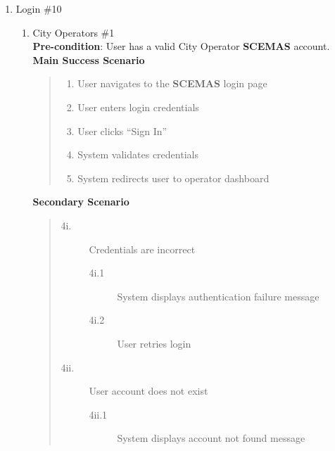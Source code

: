 \documentclass[]{article}
\begin{document}
\begin{enumerate}[{\bf BE10.}]
    \item Login \#10
        \begin{enumerate}[{\bf VP1.}]
            \item City Operators \#1\\
                \textbf{Pre-condition}: User has a valid City Operator \textbf{SCEMAS} account.\\
                \textbf{Main Success Scenario}
                \begin{quote}
                    \begin{enumerate}[1.]
                        \item User navigates to the \textbf{SCEMAS} login page
                        \item User enters login credentials
                        \item User clicks ``Sign In''
                        \item System validates credentials
                        \item System redirects user to operator dashboard
                    \end{enumerate}
                \end{quote}
                \textbf{Secondary Scenario}
                \begin{quote}
                    \begin{description}
                        \item[\textmd{4i.}] Credentials are incorrect
                        \begin{description}
                            \item[\textmd{4i.1}] System displays authentication failure message
                            \item[\textmd{4i.2}] User retries login
                        \end{description}
                        \item[\textmd{4ii.}] User account does not exist
                        \begin{description}
                            \item[\textmd{4ii.1}] System displays account not found message
                        \end{description}
                    \end{description}
                \end{quote}


\end{enumerate}
\end{enumerate}
\end{document}
